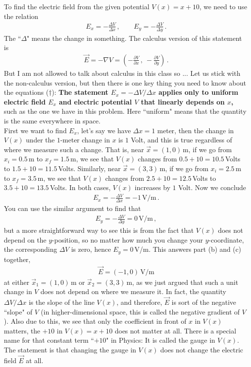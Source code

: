 \documentclass[11pt]{article}
\begin{document}
To find the electric field from the given potential $V(x) = x+10$, we need to use the relation 
\begin{align*}
E_x = -\frac{\Delta V}{\Delta x}\,,\qquad
E_y = -\frac{\Delta V}{\Delta y}\,. \tag{$\dagger$}
\end{align*} 
The ``$\Delta$" means the change in something. The calculus version of this statement is
\begin{align*}
\vec{E} = -\nabla V = \left( -\frac{\partial V}{\partial x}\,,\ -\frac{\partial V}{\partial y}\right)\,.
\end{align*}
But I am not allowed to talk about calculus in this class so ... Let us stick with the non-calculus version, but then there is one key thing you need to know about the equations ($\dagger$): \textbf{The statement $E_x = -\Delta V / \Delta x$ applies only to uniform electric field $E_x$ and electric potential $V$ that linearly depends on $x$,} such as the one we have in this problem. Here ``uniform" means that the quantity is the same everywhere in space.\\

First we want to find $E_x$, let's say we have $\Delta x = 1$ meter, then the change in $V(x)$ under the $1$-meter change in $x$ is $1$ Volt, and this is true regardless of where we measure such a change. That is, near $\vec{x} = (1,0)$\,m,  if we go from $x_i = 0.5$\,m to $x_f = 1.5$\,m, we see that $V(x)$ changes from $0.5+10 = 10.5$\,Volts to $1.5+10 = 11.5$\,Volts. Similarly, near $\vec{x} = (3,3)$\,m,  if we go from $x_i =2.5$\,m to $x_f = 3.5$\,m, we see that $V(x)$ changes from $2.5+10 = 12.5$\,Volts to $3.5+10 = 13.5$\,Volts. In both cases, $V(x)$ increases by $1$ Volt. Now we conclude
\begin{align*}
E_x = -\frac{\Delta V}{\Delta x} = -1\,\text{V/m}\,.
\end{align*}
You can use the similar argument to find that 
\begin{align*}
E_y = -\frac{\Delta V}{\Delta y} = 0 \,\text{V/m}\,,
\end{align*}
but a more straightforward way to see this is from the fact that $V(x)$ does not depend on the $y$-position, so no matter how much you change your $y$-coordinate, the corresponding $\Delta V$ is zero, hence $E_y = 0$\,V/m. This answers part (b) and (c) together, 
\begin{align*}
\vec{E} = (-1,0)\,\text{V/m}
\end{align*}
at either $\vec{x}_1 = (1,0)$\,m or $\vec{x}_2 = (3,3)\,$m, as we just argued that such a unit change in $V$ does not depend on where we measure it. In fact, the quantity $\Delta V/\Delta x$ is the slope of the line $V(x)$, and therefore, $\vec{E}$ is sort of the negative ``slope" of $V$ (in higher-dimensional space, this is called the negative gradient of $V$). Also due to this, we see that only the coefficient in front of $x$ in $V(x)$ matters, the $+10$ in $V(x)=x+10$ does not matter at all. There is a special name for that constant term ``$+10$" in Physics: It is called the gauge in $V(x)$. The statement is that changing the gauge in $V(x)$ does not change the electric field $\vec{E}$ at all. \\
\end{document}
